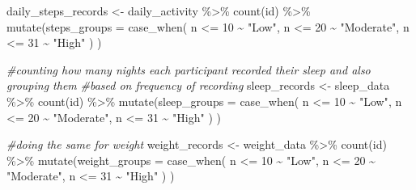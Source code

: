 \documentclass[
]{article}
\newenvironment{Shaded}{\begin{snugshade}}{\end{snugshade}}
\newcommand{\AttributeTok}[1]{\textcolor[rgb]{0.77,0.63,0.00}{#1}}
\newcommand{\CommentTok}[1]{\textcolor[rgb]{0.56,0.35,0.01}{\textit{#1}}}
\newcommand{\DecValTok}[1]{\textcolor[rgb]{0.00,0.00,0.81}{#1}}
\newcommand{\FunctionTok}[1]{\textcolor[rgb]{0.00,0.00,0.00}{#1}}
\newcommand{\NormalTok}[1]{#1}
\newcommand{\OtherTok}[1]{\textcolor[rgb]{0.56,0.35,0.01}{#1}}
\newcommand{\SpecialCharTok}[1]{\textcolor[rgb]{0.00,0.00,0.00}{#1}}
\newcommand{\StringTok}[1]{\textcolor[rgb]{0.31,0.60,0.02}{#1}}
\begin{document}
\begin{Shaded}
\begin{Highlighting}[]
\NormalTok{daily\_steps\_records }\OtherTok{\textless{}{-}} 
\NormalTok{        daily\_activity }\SpecialCharTok{\%\textgreater{}\%}
        \FunctionTok{count}\NormalTok{(id) }\SpecialCharTok{\%\textgreater{}\%}
        \FunctionTok{mutate}\NormalTok{(}\AttributeTok{steps\_groups =} \FunctionTok{case\_when}\NormalTok{(}
\NormalTok{          n }\SpecialCharTok{\textless{}=} \DecValTok{10} \SpecialCharTok{\textasciitilde{}} \StringTok{"Low"}\NormalTok{,}
\NormalTok{          n }\SpecialCharTok{\textless{}=} \DecValTok{20} \SpecialCharTok{\textasciitilde{}} \StringTok{"Moderate"}\NormalTok{,}
\NormalTok{          n }\SpecialCharTok{\textless{}=} \DecValTok{31} \SpecialCharTok{\textasciitilde{}} \StringTok{"High"}
\NormalTok{        )}
\NormalTok{           )}

       
      \CommentTok{\#counting how many nights each participant recorded their sleep and also grouping them}
       \CommentTok{\#based on frequency of recording}
\NormalTok{      sleep\_records }\OtherTok{\textless{}{-}}
\NormalTok{        sleep\_data }\SpecialCharTok{\%\textgreater{}\%}
        \FunctionTok{count}\NormalTok{(id) }\SpecialCharTok{\%\textgreater{}\%}
        \FunctionTok{mutate}\NormalTok{(}\AttributeTok{sleep\_groups =} \FunctionTok{case\_when}\NormalTok{(}
\NormalTok{          n }\SpecialCharTok{\textless{}=} \DecValTok{10} \SpecialCharTok{\textasciitilde{}} \StringTok{"Low"}\NormalTok{,}
\NormalTok{          n }\SpecialCharTok{\textless{}=} \DecValTok{20} \SpecialCharTok{\textasciitilde{}} \StringTok{"Moderate"}\NormalTok{,}
\NormalTok{          n }\SpecialCharTok{\textless{}=} \DecValTok{31} \SpecialCharTok{\textasciitilde{}} \StringTok{"High"}
\NormalTok{        )}
\NormalTok{        )}

      
       \CommentTok{\#doing the same for weight}
\NormalTok{      weight\_records }\OtherTok{\textless{}{-}}
\NormalTok{        weight\_data }\SpecialCharTok{\%\textgreater{}\%}
        \FunctionTok{count}\NormalTok{(id) }\SpecialCharTok{\%\textgreater{}\%}
        \FunctionTok{mutate}\NormalTok{(}\AttributeTok{weight\_groups =} \FunctionTok{case\_when}\NormalTok{(}
\NormalTok{          n }\SpecialCharTok{\textless{}=} \DecValTok{10} \SpecialCharTok{\textasciitilde{}} \StringTok{"Low"}\NormalTok{,}
\NormalTok{          n }\SpecialCharTok{\textless{}=} \DecValTok{20} \SpecialCharTok{\textasciitilde{}} \StringTok{"Moderate"}\NormalTok{,}
\NormalTok{          n }\SpecialCharTok{\textless{}=} \DecValTok{31} \SpecialCharTok{\textasciitilde{}} \StringTok{"High"}
\NormalTok{        )}
\NormalTok{        )}
      

\end{Highlighting}
\end{Shaded}
\end{document}
